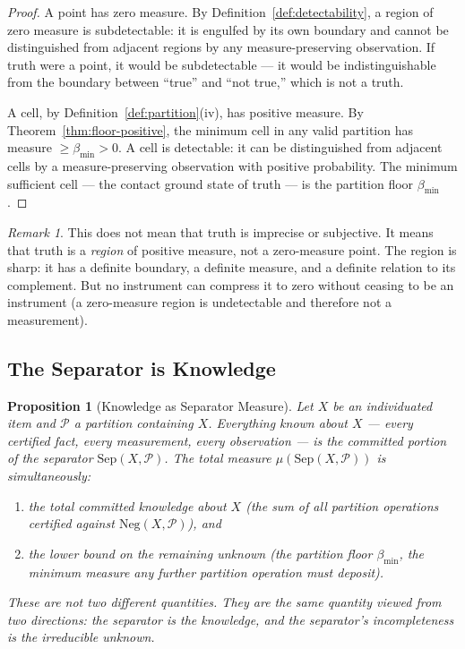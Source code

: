 \documentclass[12pt,a4paper,twocolumn]{article}
\theoremstyle{plain}
\newtheorem{proposition}[theorem]{Proposition}
\theoremstyle{definition}
\theoremstyle{remark}
\newtheorem{remark}[theorem]{Remark}
\newcommand{\Part}{\mathcal{P}}
\newcommand{\Sep}{\mathrm{Sep}}
\newcommand{\bmin}{\beta_{\min}}
\newcommand{\Neg}{\mathrm{Neg}}
\begin{document}
\begin{proof}
A point has zero measure.  By Definition~\ref{def:detectability}, a region
of zero measure is subdetectable: it is engulfed by its own boundary and
cannot be distinguished from adjacent regions by any measure-preserving
observation.  If truth were a point, it would be subdetectable --- it would
be indistinguishable from the boundary between ``true'' and ``not true,''
which is not a truth.

A cell, by Definition~\ref{def:partition}(iv), has positive measure.  By
Theorem~\ref{thm:floor-positive}, the minimum cell in any valid partition
has measure $\geq \bmin > 0$.  A cell is detectable: it can be distinguished
from adjacent cells by a measure-preserving observation with positive
probability.  The minimum sufficient cell --- the contact ground state of
truth --- is the partition floor $\bmin$.
\end{proof}

\begin{remark}
This does not mean that truth is imprecise or subjective.  It means that
truth is a \emph{region} of positive measure, not a zero-measure point.
The region is sharp: it has a definite boundary, a definite measure, and a
definite relation to its complement.  But no instrument can compress it to
zero without ceasing to be an instrument (a zero-measure region is
undetectable and therefore not a measurement).
\end{remark}

\subsection{The Separator is Knowledge}

\begin{proposition}[Knowledge as Separator Measure]
\label{prop:knowledge-separator}
Let $X$ be an individuated item and $\Part$ a partition containing $X$.
Everything known about $X$ --- every certified fact, every measurement,
every observation --- is the committed portion of the separator
$\Sep(X, \Part)$.  The total measure $\mu(\Sep(X, \Part))$ is
simultaneously:
\begin{enumerate}[label=(\roman*)]
  \item the total committed knowledge about $X$ (the sum of all partition
    operations certified against $\Neg(X, \Part)$), and
  \item the lower bound on the remaining unknown (the partition floor
    $\bmin$, the minimum measure any further partition operation must deposit).
\end{enumerate}
These are not two different quantities.  They are the same quantity viewed
from two directions: the separator is the knowledge, and the separator's
incompleteness is the irreducible unknown.
\end{proposition}
\end{document}
